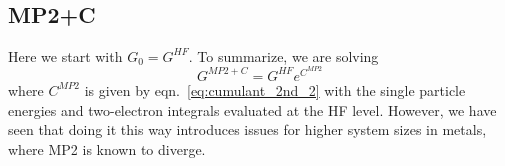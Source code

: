 \begin{align}
\end{align}
\subsection{MP2+C}
Here we start with $G_0 = G^{HF}$. To summarize, we are solving
\begin{equation}
G^{MP2+C} = G^{HF} e^{C^{MP2}}
\end{equation}
where $C^{MP2}$ is given by eqn.~\ref{eq:cumulant_2nd_2} with the single particle energies and two-electron integrals evaluated at the HF level. However, we have seen that doing it this way introduces issues for higher system sizes in metals, where MP2 is known to diverge.
